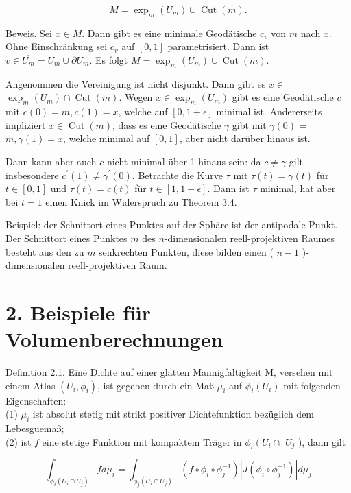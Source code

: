 \documentclass[10pt, letterpaper]{article}
\begin{document}
$$
M=\exp _{m}\left(U_{m}\right) \cup \operatorname{Cut}(m) .
$$

Beweis. Sei $x \in M$. Dann gibt es eine minimale Geodätische $c_{v}$ von $m$ nach $x$. Ohne Einschränkung sei $c_{v}$ auf $[0,1]$ parametrisiert. Dann ist $v \in \overline{U_{m}}=U_{m} \cup \partial U_{m}$. Es folgt $M=\exp _{m}\left(U_{m}\right) \cup \operatorname{Cut}(m)$.

Angenommen die Vereinigung ist nicht disjunkt. Dann gibt es $x \in$ $\exp _{m}\left(U_{m}\right) \cap \operatorname{Cut}(m)$. Wegen $x \in \exp _{m}\left(U_{m}\right)$ gibt es eine Geodätische $c$ mit $c(0)=m, c(1)=x$, welche auf $[0,1+\epsilon]$ minimal ist. Andererseits impliziert $x \in \operatorname{Cut}(m)$, dass es eine Geodätische $\gamma$ gibt mit $\gamma(0)=$ $m, \gamma(1)=x$, welche minimal auf $[0,1]$, aber nicht darüber hinaus ist.

Dann kann aber auch $c$ nicht minimal über 1 hinaus sein: da $c \neq \gamma$ gilt insbesondere $c^{\prime}(1) \neq \gamma^{\prime}(0)$. Betrachte die Kurve $\tau$ mit $\tau(t)=\gamma(t)$ für $t \in[0,1]$ und $\tau(t)=c(t)$ für $t \in[1,1+\epsilon]$. Dann ist $\tau$ minimal, hat aber bei $t=1$ einen Knick im Widerspruch zu Theorem 3.4.

Beispiel: der Schnittort eines Punktes auf der Sphäre ist der antipodale Punkt. Der Schnittort eines Punktes $m$ des $n$-dimensionalen reell-projektiven Raumes besteht aus den zu $m$ senkrechten Punkten, diese bilden einen ( $n-1$ )-dimensionalen reell-projektiven Raum.

\section*{2. Beispiele für Volumenberechnungen}
Definition 2.1. Eine Dichte auf einer glatten Mannigfaltigkeit M, versehen mit einem Atlas $\left(U_{i}, \phi_{i}\right)$, ist gegeben durch ein Maß $\mu_{i}$ auf $\phi_{i}\left(U_{i}\right)$ mit folgenden Eigenschaften:\\
(1) $\mu_{i}$ ist absolut stetig mit strikt positiver Dichtefunktion bezüglich dem Lebesguemaß;\\
(2) ist $f$ eine stetige Funktion mit kompaktem Träger in $\phi_{i}\left(U_{i} \cap\right.$ $U_{j}$ ), dann gilt

$$
\int_{\phi_{i}\left(U_{i} \cap U_{j}\right)} f d \mu_{i}=\int_{\phi_{j}\left(U_{i} \cap U_{j}\right)}\left(f \circ \phi_{i} \circ \phi_{j}^{-1}\right)\left|J\left(\phi_{i} \circ \phi_{j}^{-1}\right)\right| d \mu_{j}
$$
\end{document}
